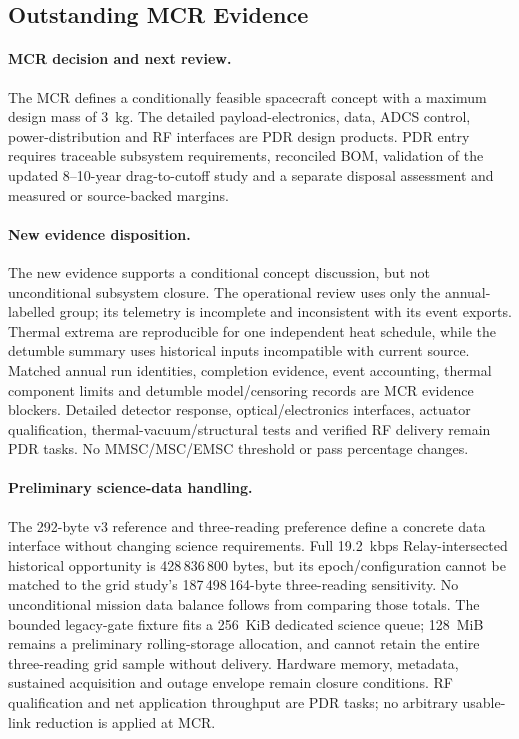 \subsection{Outstanding MCR Evidence}
\paragraph{MCR decision and next review.} The MCR defines a conditionally feasible spacecraft concept with a maximum design mass of 3~kg. The detailed payload-electronics, data, ADCS control, power-distribution and RF interfaces are PDR design products. PDR entry requires traceable subsystem requirements, reconciled BOM, validation of the updated 8--10-year drag-to-cutoff study and a separate disposal assessment and measured or source-backed margins.

\paragraph{New evidence disposition.}
The new evidence supports a conditional concept discussion, but not unconditional subsystem closure. The operational review uses only the annual-labelled group; its telemetry is incomplete and inconsistent with its event exports. Thermal extrema are reproducible for one independent heat schedule, while the detumble summary uses historical inputs incompatible with current source. Matched annual run identities, completion evidence, event accounting, thermal component limits and detumble model/censoring records are MCR evidence blockers. Detailed detector response, optical/electronics interfaces, actuator qualification, thermal-vacuum/structural tests and verified RF delivery remain PDR tasks. No MMSC/MSC/EMSC threshold or pass percentage changes.

\paragraph{Preliminary science-data handling.}
The 292-byte v3 reference and three-reading preference define a concrete data interface without changing science requirements. Full 19.2~kbps Relay-intersected historical opportunity is 428\,836\,800 bytes, but its epoch/configuration cannot be matched to the grid study's 187\,498\,164-byte three-reading sensitivity. No unconditional mission data balance follows from comparing those totals. The bounded legacy-gate fixture fits a 256~KiB dedicated science queue; 128~MiB remains a preliminary rolling-storage allocation, and cannot retain the entire three-reading grid sample without delivery. Hardware memory, metadata, sustained acquisition and outage envelope remain closure conditions. RF qualification and net application throughput are PDR tasks; no arbitrary usable-link reduction is applied at MCR.
